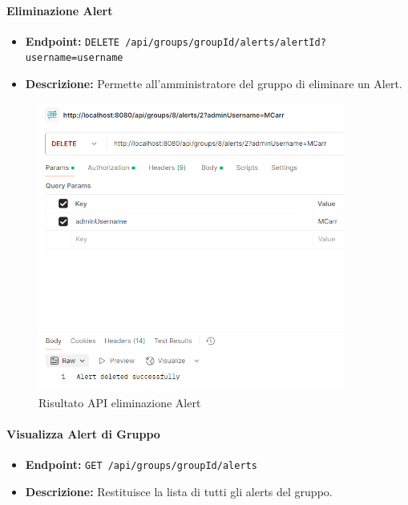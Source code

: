 \paragraph{Eliminazione Alert}

\begin{itemize}
    \item \textbf{Endpoint:} \texttt{DELETE /api/groups/{groupId}/alerts/{alertId}?username={username}}
    \item \textbf{Descrizione:} Permette all'amministratore del gruppo di eliminare un Alert.
\end{itemize}

\begin{figure}[H]
    \centering
    \includegraphics[width=0.9\textwidth]{images/DeleteAlert.png}
    \caption{Risultato API eliminazione Alert}
    \label{fig:api_deleteAlert}
\end{figure}

\paragraph{Visualizza Alert di Gruppo}

\begin{itemize}
    \item \textbf{Endpoint:} \texttt{GET /api/groups/{groupId}/alerts}
    \item \textbf{Descrizione:} Restituisce la lista di tutti gli alerts del gruppo.
\end{itemize}

